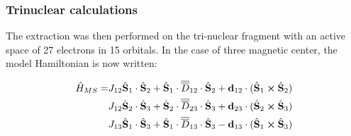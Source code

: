 \documentclass[12pt,a4paper]{report}
\numberwithin{equation}{section}
\begin{document}
\subsubsection*{Trinuclear calculations}

The extraction was then performed on the tri-nuclear fragment with an active space of 27 electrons in 15 orbitals.
In the case of three magnetic center, the model Hamiltonian is now written:


\begin{equation}
    \begin{split}
    \hat{H}_{MS}=&J_{12} \hat{\vb S}_1 \cdot \hat{\vb S}_2 + \hat{\vb S}_1 \cdot\overline{\overline{D}}_{12} \cdot \hat{\vb S}_2 + \vb{d}_{12} \cdot (\hat{\vb S}_1 \cross \hat{\vb S}_2)\\
    &J_{12} \hat{\vb S}_2 \cdot \hat{\vb S}_3 + \hat{\vb S}_2 \cdot\overline{\overline{D}}_{23} \cdot \hat{\vb S}_3 + \vb{d}_{23} \cdot (\hat{\vb S}_2 \cross \hat{\vb S}_3)\\
    &J_{13} \hat{\vb S}_1 \cdot \hat{\vb S}_3 + \hat{\vb S}_1 \cdot\overline{\overline{D}}_{13} \cdot \hat{\vb S}_3 - \vb{d}_{13} \cdot (\hat{\vb S}_1 \cross \hat{\vb S}_3)
    \end{split}
\end{equation}
\end{document}
